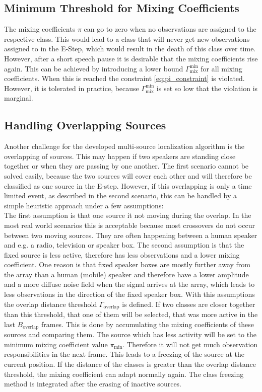 \subsection{Minimum Threshold for Mixing Coefficients}
The mixing coefficients $\pi$ can go to zero when no observations are assigned to the respective class. This would lead to a class that will never get new observations assigned to in the E-Step, which would result in the death of this class over time. However, after a short speech pause it is desirable that the mixing coefficients rise again. This can be achieved by introducing a lower bound $\Gamma^\text{min}_\text{mix}$ for all mixing coefficients. When this is reached the constraint \ref{eq:pi_constraint} is violated. However, it is tolerated in practice, because $\Gamma^\text{min}_\text{mix}$ is set so low that the violation is marginal.

\subsection{Handling Overlapping Sources}
\label{subsec:overlap}

Another challenge for the developed multi-source localization algorithm is the overlapping of sources. This may happen if two speakers are standing close together or when they are passing by one another. The first scenario cannot be solved easily, because the two sources will cover each other and will therefore be classified as one source in the E-step. However, if this overlapping is only a time limited event, as described in the second scenario, this can be handled by a simple heuristic approach under a few assumptions:\\
The first assumption is that one source it not moving during the overlap. In the most real world scenarios this is acceptable because most crossovers do not occur between two moving sources. They are often happening between a human speaker and e.g. a radio, television or speaker box. The second assumption is that the fixed source is less active, therefore has less observations and a lower mixing coefficient. One reason is that fixed speaker boxes are mostly further away from the array than a human (mobile) speaker and therefore have a lower amplitude and a more diffuse noise field when the signal arrives at the array, which leads to less observations in the direction of the fixed speaker box. With this assumptions the overlap distance threshold $\Gamma_\text{overlap}$ is defined. If two classes are closer together than this threshold, that one of them will be selected, that was more active in the last $B_\text{overlap}$ frames. This is done by accumulating the mixing coefficients of these sources and comparing them. The source which has less activity will be set to the minimum mixing coefficient value $\pi_\text{min}$. Therefore it will not get much observation responsibilities in the next frame. This leads to a freezing of the source at the current position. If the distance of the classes is greater than the overlap distance threshold, the mixing coefficient can adapt normally again. The class freezing method is integrated after the erasing of inactive sources.

